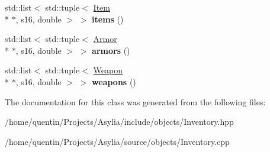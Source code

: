 \begin{DoxyCompactItemize}
\item 
\hypertarget{classInventory_a24d0f068e7857fd840a24844442838c4}{std\-::list$<$ std\-::tuple$<$ \hyperlink{classItem}{Item} \\*
$\ast$, s16, double $>$ $>$ {\bfseries items} ()}\label{classInventory_a24d0f068e7857fd840a24844442838c4}

\item 
\hypertarget{classInventory_a74d7902db8cc816e060319b20a2a1c14}{std\-::list$<$ std\-::tuple$<$ \hyperlink{classArmor}{Armor} \\*
$\ast$, s16, double $>$ $>$ {\bfseries armors} ()}\label{classInventory_a74d7902db8cc816e060319b20a2a1c14}

\item 
\hypertarget{classInventory_a8614c96421dfc63a8a8c37237b0c1873}{std\-::list$<$ std\-::tuple$<$ \hyperlink{classWeapon}{Weapon} \\*
$\ast$, s16, double $>$ $>$ {\bfseries weapons} ()}\label{classInventory_a8614c96421dfc63a8a8c37237b0c1873}

\end{DoxyCompactItemize}


The documentation for this class was generated from the following files\-:\begin{DoxyCompactItemize}
\item 
/home/quentin/\-Projects/\-Asylia/include/objects/Inventory.\-hpp\item 
/home/quentin/\-Projects/\-Asylia/source/objects/Inventory.\-cpp\end{DoxyCompactItemize}
